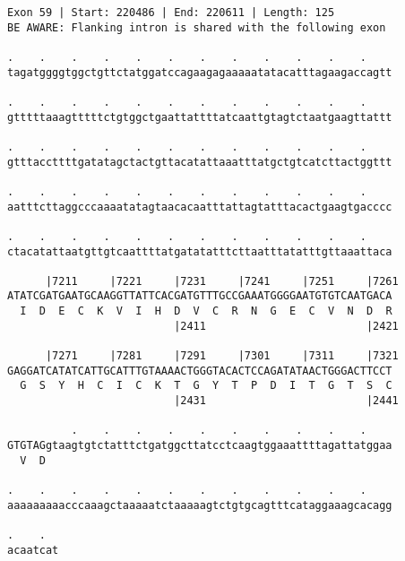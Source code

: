 \documentclass{article}
\begin{document}
\newpage
\begin{Verbatim}
Exon 59 | Start: 220486 | End: 220611 | Length: 125
BE AWARE: Flanking intron is shared with the following exon
 
.    .    .    .    .    .    .    .    .    .    .    .    
tagatggggtggctgttctatggatccagaagagaaaaatatacatttagaagaccagtt
  
.    .    .    .    .    .    .    .    .    .    .    .    
gtttttaaagtttttctgtggctgaattattttatcaattgtagtctaatgaagttattt
  
.    .    .    .    .    .    .    .    .    .    .    .    
gtttaccttttgatatagctactgttacatattaaatttatgctgtcatcttactggttt
  
.    .    .    .    .    .    .    .    .    .    .    .    
aatttcttaggcccaaaatatagtaacacaatttattagtatttacactgaagtgacccc
  
.    .    .    .    .    .    .    .    .    .    .    .    
ctacatattaatgttgtcaattttatgatatatttcttaatttatatttgttaaattaca
  
      |7211     |7221     |7231     |7241     |7251     |7261
ATATCGATGAATGCAAGGTTATTCACGATGTTTGCCGAAATGGGGAATGTGTCAATGACA
  I  D  E  C  K  V  I  H  D  V  C  R  N  G  E  C  V  N  D  R
                          |2411                         |2421
  
      |7271     |7281     |7291     |7301     |7311     |7321
GAGGATCATATCATTGCATTTGTAAAACTGGGTACACTCCAGATATAACTGGGACTTCCT
  G  S  Y  H  C  I  C  K  T  G  Y  T  P  D  I  T  G  T  S  C
                          |2431                         |2441
  
          .    .    .    .    .    .    .    .    .    .    
GTGTAGgtaagtgtctatttctgatggcttatcctcaagtggaaattttagattatggaa
  V  D                                                      
  
.    .    .    .    .    .    .    .    .    .    .    .    
aaaaaaaaacccaaagctaaaaatctaaaaagtctgtgcagtttcataggaaagcacagg
  
.    .  
acaatcat
\end{Verbatim}
\newpage
\end{document}
